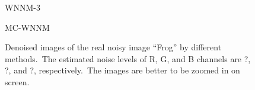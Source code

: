 \begin{figure}
{\begin{minipage}[t]{0.19\textwidth}
{\footnotesize WNNM-3 }
\end{minipage}
\begin{minipage}[t]{0.19\textwidth}
\centering
{}
{\footnotesize MC-WNNM }
\end{minipage}
}
    \caption{Denoised images of the real noisy image ``Frog'' \cite{ncwebsite} by different methods.\ The estimated noise levels of R, G, and B channels are ?, ?, and ?, respectively.\ The images are better to be zoomed in on screen.}
    \label{fig4-9}
\end{figure}


